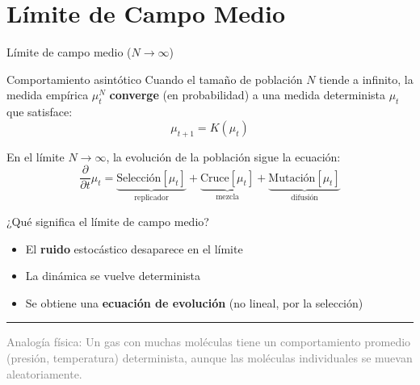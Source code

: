 \documentclass[10pt, aspectratio=169]{beamer}
\begin{document}
\section{Límite de Campo Medio}

\begin{frame}{Límite de campo medio ($N \to \infty$)}
\begin{block}{Comportamiento asintótico}
Cuando el tamaño de población $N$ tiende a infinito, la medida empírica $\mu_t^N$ \textbf{converge} (en probabilidad) a una medida determinista $\mu_t$ que satisface:
\[
\mu_{t+1} = K(\mu_t)
\]
\end{block}

\begin{theorem}
En el límite $N \to \infty$, la evolución de la población sigue la ecuación:
\[
\frac{\partial}{\partial t} \mu_t = \underbrace{\text{Selección}[\mu_t]}_{\text{replicador}} + \underbrace{\text{Cruce}[\mu_t]}_{\text{mezcla}} + \underbrace{\text{Mutación}[\mu_t]}_{\text{difusión}}
\]
\end{theorem}
\end{frame}

\begin{frame}{¿Qué significa el límite de campo medio?}
\begin{itemize}
    \item El \textbf{ruido} estocástico desaparece en el límite
    \item La dinámica se vuelve \alert{determinista}
    \item Se obtiene una \textbf{ecuación de evolución} (no lineal, por la selección)
\end{itemize}

\vspace{3mm}
\centering
{}

\vspace{3mm}
\rule{\textwidth}{0.5pt}
\vspace{2mm}
\footnotesize \textcolor{gray}{Analogía física: Un gas con muchas moléculas tiene un comportamiento promedio (presión, temperatura) determinista, aunque las moléculas individuales se muevan aleatoriamente.}
\end{frame}
\end{document}
